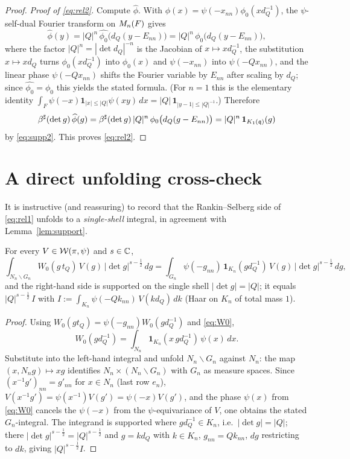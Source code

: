 \begin{proof}
\emph{Proof of \eqref{eq:rel2}.} Compute $\widehat\phi$. With $\phi(x)=\psi(-x_{nn})\phi_0(x d_Q^{-1})$,
the $\psi$-self-dual Fourier transform on $M_n(F)$ gives
\[
\widehat\phi(y)=|Q|^{n}\,\widehat{\phi_0}\big(d_Q(y-E_{nn})\big)=|Q|^{n}\,\phi_0\big(d_Q(y-E_{nn})\big),
\]
where the factor $|Q|^{n}=|\det d_Q|^{-n}$ is the Jacobian of $x\mapsto x d_Q^{-1}$, the substitution
$x\mapsto x d_Q$ turns $\phi_0(x d_Q^{-1})$ into $\phi_0(x)$ and $\psi(-x_{nn})$ into $\psi(-Q x_{nn})$,
and the linear phase $\psi(-Q x_{nn})$ shifts the Fourier variable by $E_{nn}$ after scaling by $d_Q$;
since $\widehat{\phi_0}=\phi_0$ this yields the stated formula. (For $n=1$ this is the elementary identity
$\int_{F}\psi(-x)\mathbf 1_{|x|\le|Q|}\psi(xy)\,dx=|Q|\,\mathbf 1_{|y-1|\le|Q|^{-1}}$.) Therefore
\[
\beta^\sharp(\det g)\,\widehat\phi(g)=\beta^\sharp(\det g)\,|Q|^{n}\,\phi_0\big(d_Q(g-E_{nn})\big)
=|Q|^{n}\,\mathbf 1_{K_1(\mathfrak{q})}(g)
\]
by \eqref{eq:supp2}. This proves \eqref{eq:rel2}.
\end{proof}

\section*{A direct unfolding cross-check}

It is instructive (and reassuring) to record that the Rankin--Selberg side of
\eqref{eq:rel1} unfolds to a \emph{single-shell} integral, in agreement with
Lemma~\ref{lem:support}.

\begin{qtwolemma}\label{lem:unfold}
For every $V\in\mathcal{W}(\pi,\psi)$ and $s\in\mathbb{C}$,
\[
\int_{N_n\backslash G_n} W_0(g\,t_Q)\,V(g)\,|\det g|^{s-\frac12}\,dg
=\int_{G_n}\psi(-g_{nn})\,\mathbf 1_{K_n}(g d_Q^{-1})\,V(g)\,|\det g|^{s-\frac12}\,dg ,
\]
and the right-hand side is supported on the single shell $|\det g|=|Q|$; it equals
$|Q|^{s-\frac12}\,I$ with $I:=\int_{K_n}\psi(-Q k_{nn})\,V(k d_Q)\,dk$ (Haar on $K_n$ of total
mass $1$).
\end{qtwolemma}

\begin{proof}
Using $W_0(g t_Q)=\psi(-g_{nn})W_0(g d_Q^{-1})$ and \eqref{eq:W0},
\[
W_0(g d_Q^{-1})=\int_{N_n}\mathbf 1_{K_n}(x\,g d_Q^{-1})\,\psi(x)\,dx .
\]
Substitute into the left-hand integral and unfold $N_n\backslash G_n$ against $N_n$: the map
$(x,N_n g)\mapsto xg$ identifies $N_n\times(N_n\backslash G_n)$ with $G_n$ as measure spaces.
Since $(x^{-1}g')_{nn}=g'_{nn}$ for $x\in N_n$ (last row $e_n$), $V(x^{-1}g')=\psi(x^{-1})V(g')
=\psi(-x)V(g')$, and the phase $\psi(x)$ from \eqref{eq:W0} cancels the $\psi(-x)$ from the
$\psi$-equivariance of $V$, one obtains the stated $G_n$-integral. The integrand is supported
where $g d_Q^{-1}\in K_n$, i.e.\ $|\det g|=|Q|$; there $|\det g|^{s-\frac12}=|Q|^{s-\frac12}$ and
$g=k d_Q$ with $k\in K_n$, $g_{nn}=Q k_{nn}$, $dg$ restricting to $dk$, giving $|Q|^{s-\frac12}I$.
\end{proof}

